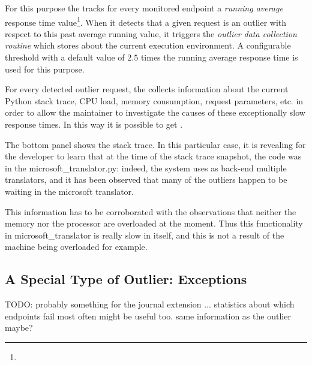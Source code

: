 \documentclass[conference]{IEEEtran}
\begin{document}
  
  For this purpose the \tool tracks for every monitored endpoint a {\em running average} response time value\footnote{}. When it detects that a given request is an outlier with respect to this past average running value, it triggers the {\em outlier data collection routine} which stores  about the current execution environment. A configurable threshold with a default value of $2.5$ times the running average response time is used for this purpose. 

  For every detected outlier request, the \tool collects information about the current Python stack trace, CPU load, memory consumption, request parameters, etc. in order to allow the maintainer to investigate the causes of these exceptionally slow response times. In this way it is possible to get .
  

The bottom panel shows the stack trace. 
In this particular case, it is revealing for the developer to learn that at the time of the stack trace snapshot, the code was in the microsoft\_translator.py: indeed, the system uses as back-end multiple translators, and it has been observed that many of the outliers happen to be waiting in the microsoft translator.

This information has to be corroborated with the observations that neither the memory nor the processor are overloaded at the moment. Thus this functionality in microsoft\_translator is really slow in itself, and this is not a result of the machine being overloaded for example. 



\subsection {A Special Type of Outlier: Exceptions}

   TODO: probably something for the journal extension ...
  statistics about which endpoints fail most often might be useful too.
  same information as the outlier maybe?
\end{document}
